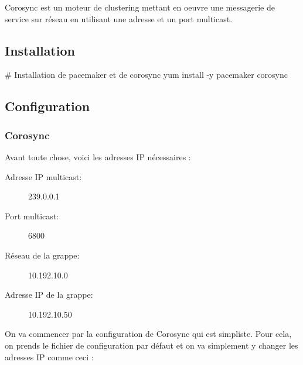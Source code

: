 \documentclass[11pt,a4paper]{report}
\begin{document}
                Corosync est un moteur de clustering mettant en oeuvre une messagerie de service sur réseau en utilisant une adresse et un port multicast.
                
            \subsection{Installation}
                
                \begin{bashcode}
                    # Installation de pacemaker et de corosync
                    yum install -y pacemaker corosync
                \end{bashcode}
                
            \subsection{Configuration}
                
                \subsubsection{Corosync}
                    
                    Avant toute chose, voici les adresses IP nécessaires :\\
                    
                    \begin{description}
                        \item[Adresse IP multicast:] 239.0.0.1
                        \item[Port multicast:] 6800
                        \item[Réseau de la grappe:] 10.192.10.0
                        \item[Adresse IP de la grappe:] 10.192.10.50
                    \end{description}
                    
                    On va commencer par la configuration de Corosync qui est simpliste. Pour cela, on prends le fichier de configuration par défaut et on va simplement y changer les adresses IP comme ceci :\\
                    
                    
\end{document}
